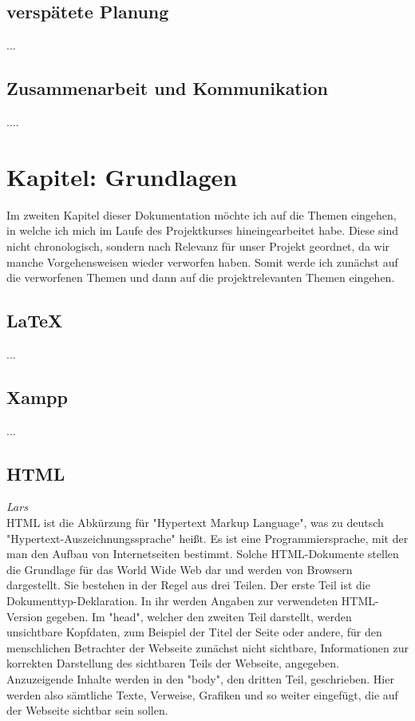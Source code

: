 \documentclass[12pt,a4paper,bibliography=totocnumbered,listof=totocnumbered]{scrartcl}
\begin{document}
\subsection{verspätete Planung}
...
\subsection{Zusammenarbeit und Kommunikation}
....

\section{Kapitel: Grundlagen}
Im zweiten Kapitel dieser Dokumentation möchte ich auf die Themen eingehen, in welche ich mich im Laufe des Projektkurses hineingearbeitet habe.
Diese sind nicht chronologisch, sondern nach Relevanz für unser Projekt geordnet, da wir manche Vorgehensweisen wieder verworfen haben.
Somit werde ich zunächst auf die verworfenen Themen und dann auf die projektrelevanten Themen eingehen.

\subsection{\LaTeX{}}
...

\subsection{Xampp}
...

\subsection{HTML}
\emph{Lars}\\
HTML ist die Abkürzung für "Hypertext Markup Language", was zu deutsch "Hypertext-Auszeichnungssprache" heißt. Es ist eine Programmiersprache, mit der man den Aufbau von Internetseiten bestimmt. Solche HTML-Dokumente stellen die Grundlage für das World Wide Web dar und werden von Browsern dargestellt.\cite{HTML}\cite{Hypertext_Markup_Language} Sie bestehen in der Regel aus drei Teilen.\cite{HTML/Dokumentstruktur_und_Aufbau} Der erste Teil ist die Dokumenttyp-Deklaration. In ihr werden Angaben zur verwendeten HTML-Version gegeben. Im "head", welcher den zweiten Teil darstellt, werden unsichtbare Kopfdaten, zum Beispiel der Titel der Seite oder andere, für den menschlichen Betrachter der Webseite zunächst nicht sichtbare, Informationen zur korrekten Darstellung des sichtbaren Teils der Webseite, angegeben.\cite{HTML/Kopfdaten} Anzuzeigende Inhalte werden in den "body", den dritten Teil, geschrieben. Hier werden also sämtliche Texte, Verweise, Grafiken und so weiter eingefügt, die auf der Webseite sichtbar sein sollen.\cite{HTML/Dokumentstruktur_und_Aufbau}
\end{document}
